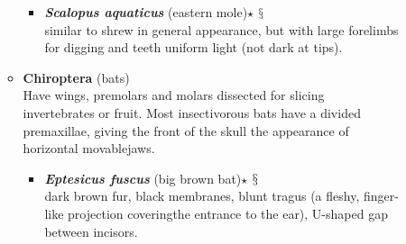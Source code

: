 \documentclass[a4paper,12pt]{article}
\begin{document}
\begin{description}
\begin{itemize}
\begin{itemize}
    \begin{itemize}
      \item{\textbf{\textit{Scalopus aquaticus}} (eastern mole)$\star$ $\mathsection$} \\ similar to shrew in general appearance, but with large forelimbs for digging and teeth uniform light (not dark at tips).
    \end{itemize}  
    \item{\textbf{Chiroptera} (bats)} \\ Have wings, premolars and molars dissected for slicing invertebrates or fruit. Most insectivorous bats have a divided premaxillae, giving the front of the skull the appearance of horizontal movablejaws.
    \begin{itemize}
      \item{\textbf{\textit{Eptesicus fuscus}} (big brown bat)$\star$ $\mathsection$} \\ dark brown fur, black membranes, blunt tragus (a fleshy, finger-like projection coveringthe entrance to the ear), U-shaped gap between incisors.


\end{itemize}
\end{itemize}
\end{itemize}
\end{description}
\end{document}
